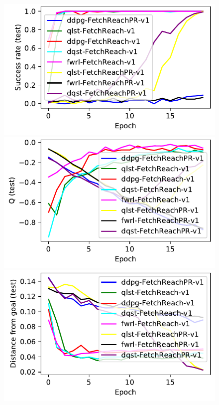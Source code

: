 %
\begin{figure}%
  \def\frac{0.24}
  \includegraphics[width=\frac\columnwidth]{media/res/245b3c4-ce781a70-FetchReachPR-v1-fwrl-future-her_fwrl_path_reward/test/success_rate.pdf}%
  \includegraphics[width=\frac\columnwidth]{media/res/245b3c4-ce781a70-FetchReachPR-v1-fwrl-future-her_fwrl_path_reward/test/mean_Q.pdf}%
  \includegraphics[width=\frac\columnwidth]{media/res/245b3c4-ce781a70-FetchReachPR-v1-fwrl-future-her_fwrl_path_reward/test/ag_g_dist.pdf}%

\end{figure}
